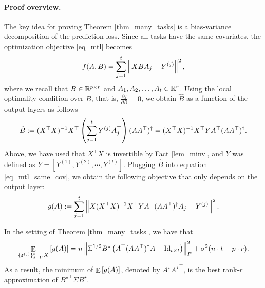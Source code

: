 	\paragraph{Proof overview.} The key idea for proving Theorem \ref{thm_many_tasks} is a bias-variance decomposition of the prediction loss.
	Since all tasks have the same covariates, the optimization objective \eqref{eq_mtl} becomes
	\begin{align}
		f(A, B) = \sum_{j=1}^t \left\| X B A_j - Y^{(j)} \right\|^2, \label{eq_mtl_same_cov}
	\end{align}
	where we recall that $B \in \mathbb{R}^{p \times r}$ and $A_1, A_2, \dots, A_t \in \mathbb{R}^r$.
	Using the local optimality condition over $B$, that is, $\frac{\partial f}{\partial B} = 0$, we obtain $\hat{B}$ as a function of the output layers as follows
	\begin{align} \label{eq_Bhat}
		\hat{B} := (X^{\top}X)^{-1} X^{\top} \left({\sum_{j=1}^t Y^{(j)} A_j^{\top}}\right) (A  A^{\top})^{\dagger}
		= (X^{\top} X)^{-1} X^{\top} Y A^{\top} (AA^{\top})^{\dagger}.
	\end{align}
	Above, we have used that $X^{\top}X$ is invertible by Fact \ref{lem_minv}, and $Y$ was defined as $Y=[Y^{(1)},Y^{(2)},\cdots, Y^{(t)}]$. 
	Plugging $\hat{B}$ into equation \eqref{eq_mtl_same_cov}, we obtain the following objective that only depends on the output layer:
	\begin{align}
		g(A) := \sum_{j=1}^t \left\| X (X^{\top}X)^{-1}X^{\top} Y A^{\top} (AA^{\top})^{\dagger} A_j - Y^{(j)} \right\|^2. \label{eq_mtl_output_layer}
	\end{align}

	\begin{claim}\label{lem_exp_opt}
		In the setting of Theorem \ref{thm_many_tasks}, we have that
		\begin{align}
			\mathop{\mathbb{E}}_{\{\varepsilon^{(j)}\}_{j=1}^t, X}\left[ g(A) \right] = n \left\| \Sigma^{1/2} B^{\star} \left({A^{\top} (AA^{\top})^{\dagger} A - \operatorname{Id}_{t\times t}}\right) \right\|_{F}^2 + \sigma^2 (n\cdot t - p \cdot r). \label{eq_gA}
		\end{align}
		As a result, the minimum of $\mathop{\mathbb{E}}\left[ g(A) \right]$, denoted by $A^{\star}{A^\star}^\top$, is the best rank-$r$ approximation of ${B^{\star}}^{\top}\Sigma B^{\star}$.
	\end{claim}

